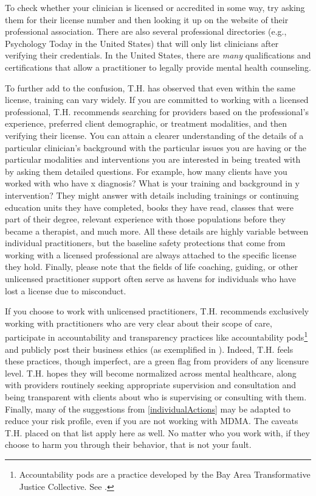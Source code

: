 \documentclass[11pt,oneside]{book}
\begin{document}
To check whether your clinician is licensed or accredited in some way, try asking them for their license number and then looking it up on the website of their professional association. There are also several professional directories (e.g., Psychology Today in the United States) that will only list clinicians after verifying their credentials. In the United States, there are \textit{many} qualifications and certifications that allow a practitioner to legally provide mental health counseling.

To further add to the confusion, T.H. has observed that even within the same license, training can vary widely. If you are committed to working with a licensed professional, T.H. recommends searching for providers based on the professional's experience, preferred client demographic, or treatment modalities, and then verifying their license. You can attain a clearer understanding of the details of a particular clinician's background with the particular issues you are having or the particular modalities and interventions you are interested in being treated with by asking them detailed questions. For example, how many clients have you worked with who have x diagnosis? What is your training and background in y intervention? They might answer with details including trainings or continuing education units they have completed, books they have read, classes that were part of their degree, relevant experience with those populations before they became a therapist, and much more. All these details are highly variable between individual practitioners, but the baseline safety protections that come from working with a licensed professional are always attached to the specific license they hold. Finally, please note that the fields of life coaching, guiding, or other unlicensed practitioner support often serve as havens for individuals who have lost a license due to misconduct.

If you choose to work with unlicensed practitioners, T.H. recommends exclusively working with practitioners who are very clear about their scope of care, participate in accountability and transparency practices like accountability pods\footnote{Accountability pods are a practice developed by the Bay Area Transformative Justice Collective. See \textcite{podmapping}.} and publicly post their business ethics (as exemplified in \textcite{sinbackValues}). Indeed, T.H. feels these practices, though imperfect, are a green flag from providers of any licensure level. T.H. hopes they will become normalized across mental healthcare, along with providers routinely seeking appropriate supervision and consultation and being transparent with clients about who is supervising or consulting with them. Finally, many of the suggestions from \cref{individualActions} may be adapted to reduce your risk profile, even if you are not working with MDMA. The caveats T.H. placed on that list apply here as well. No matter who you work with, if they choose to harm you through their behavior, that is not your fault.
\end{document}

